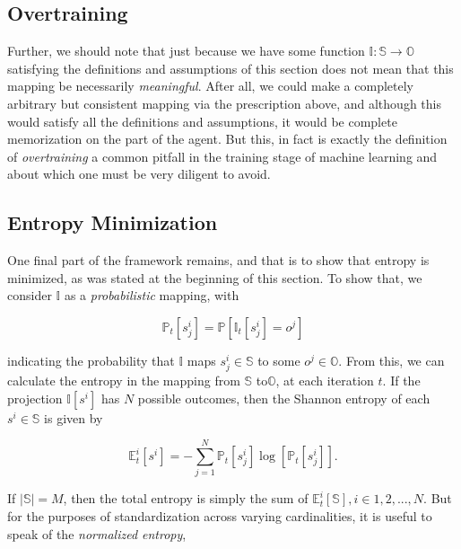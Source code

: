 \documentclass[english]{article}
\begin{document}
\subsection{Overtraining}

Further, we should note that just because we have some function $\mathbb{I}:\mathbb{S}\rightarrow\mathbb{O}$
satisfying the definitions and assumptions of this section does not
mean that this mapping be necessarily \emph{meaningful}. After all,
we could make a completely arbitrary but consistent mapping via the
prescription above, and although this would satisfy all the definitions
and assumptions, it would be complete memorization on the part of
the agent. But this, in fact is exactly the definition of \emph{overtraining}
a common pitfall in the training stage of machine learning and about
which one must be very diligent to avoid.


\subsection{Entropy Minimization}

One final part of the framework remains, and that is to show that
entropy is minimized, as was stated at the beginning of this section.
To show that, we consider $\mathbb{I}$ as a \emph{probabilistic }mapping,
with

\begin{equation}
\mathbb{P}_{t}\left[s_{j}^{i}\right]=\mathbb{P}\left[\mathbb{I}_{t}\left[s_{j}^{i}\right]=o^{j}\right]
\end{equation}


indicating the probability that $\mathbb{I}$ maps $s_{j}^{i}\in\mathbb{S}$
to some $o^{j}\in\mathbb{O}$. From this, we can calculate the entropy
in the mapping from $\mathbb{S}$ to$\mathbb{O}$, at each iteration
$t$. If the projection $\mathbb{I}\left[s^{i}\right]$ has $N$ possible
outcomes, then the Shannon entropy of each$s^{i}\in\mathbb{S}$ is
given by

\begin{equation}
\mathbb{E}_{t}^{i}\left[s^{i}\right]=-\sum_{j=1}^{N}\mathbb{P}_{t}\left[s_{j}^{i}\right]\log\left[\mathbb{P}_{t}\left[s_{j}^{i}\right]\right].
\end{equation}


If $\left|\mathbb{S}\right|=M$, then the total entropy is simply
the sum of $\mathbb{E}_{t}^{i}\left[\mathbb{S}\right],i\in{1,2,...,N}$.
But for the purposes of standardization across varying cardinalities,
it is useful to speak of the \emph{normalized entropy}, 
\end{document}
